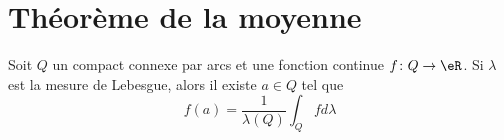 
\section{Théorème de la moyenne}

\begin{theorem}      \label{ThoooEZLGooMChwLT}
    Soit \( Q\) un compact connexe par arcs et une fonction continue \( f\colon Q\to \eR\). Si \( \lambda\) est la mesure de Lebesgue, alors il existe \( a\in Q\) tel que
    \begin{equation}
        f(a)=\frac{1}{ \lambda(Q) }\int_Qfd\lambda
    \end{equation}
\end{theorem}

